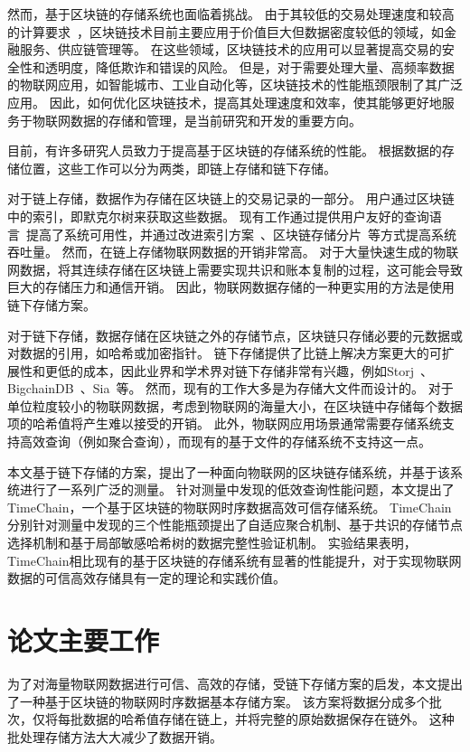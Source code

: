 然而，基于区块链的存储系统也面临着挑战。
由于其较低的交易处理速度和较高的计算要求~\cite{dorri2017towards}，区块链技术目前主要应用于价值巨大但数据密度较低的领域，如金融服务、供应链管理等。
在这些领域，区块链技术的应用可以显著提高交易的安全性和透明度，降低欺诈和错误的风险。
但是，对于需要处理大量、高频率数据的物联网应用，如智能城市、工业自动化等，区块链技术的性能瓶颈限制了其广泛应用。
因此，如何优化区块链技术，提高其处理速度和效率，使其能够更好地服务于物联网数据的存储和管理，是当前研究和开发的重要方向。

目前，有许多研究人员致力于提高基于区块链的存储系统的性能。
根据数据的存储位置，这些工作可以分为两类，即链上存储和链下存储。

对于链上存储，数据作为存储在区块链上的交易记录的一部分。
用户通过区块链中的索引，即默克尔树来获取这些数据。
现有工作通过提供用户友好的查询语言~\cite{zhu2019sebdb,xu2019vchain,wang2022vchain+}提高了系统可用性，并通过改进索引方案~\cite{li2023lvmt,zhang2024cole}、区块链存储分片~\cite{zamani2018rapidchain,hong2023gridb,el2019blockchaindb}等方式提高系统吞吐量。
然而，在链上存储物联网数据的开销非常高。
对于大量快速生成的物联网数据，将其连续存储在区块链上需要实现共识和账本复制的过程，这可能会导致巨大的存储压力和通信开销。
因此，物联网数据存储的一种更实用的方法是使用链下存储方案。

对于链下存储，数据存储在区块链之外的存储节点，区块链只存储必要的元数据或对数据的引用，如哈希或加密指针。
链下存储提供了比链上解决方案更大的可扩展性和更低的成本，因此业界和学术界对链下存储非常有兴趣，例如Storj~\cite{storj2018storj}、BigchainDB~\cite{mcconaghy2016bigchaindb}、Sia~\cite{sia}等。
然而，现有的工作大多是为存储大文件而设计的。
对于单位粒度较小的物联网数据，考虑到物联网的海量大小，在区块链中存储每个数据项的哈希值将产生难以接受的开销。
此外，物联网应用场景通常需要存储系统支持高效查询（例如聚合查询），而现有的基于文件的存储系统不支持这一点。

本文基于链下存储的方案，提出了一种面向物联网的区块链存储系统，并基于该系统进行了一系列广泛的测量。
针对测量中发现的低效查询性能问题，本文提出了TimeChain，一个基于区块链的物联网时序数据高效可信存储系统。
TimeChain分别针对测量中发现的三个性能瓶颈提出了自适应聚合机制、基于共识的存储节点选择机制和基于局部敏感哈希树的数据完整性验证机制。
实验结果表明，TimeChain相比现有的基于区块链的存储系统有显著的性能提升，对于实现物联网数据的可信高效存储具有一定的理论和实践价值。

\section{论文主要工作}
为了对海量物联网数据进行可信、高效的存储，受链下存储方案的启发，本文提出了一种基于区块链的物联网时序数据基本存储方案。
该方案将数据分成多个批次，仅将每批数据的哈希值存储在链上，并将完整的原始数据保存在链外。
这种批处理存储方法大大减少了数据开销。


